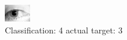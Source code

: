 \begin{figure}[h!]
\begin{center}
\includegraphics[width=0.60\columnwidth]{figures/ID1251_class_4_target_3.png}
\end{center}
\caption{ Classification: 4 actual target: 3}
\label{fig:ID1251_class_4_target_3}
\end{figure}
